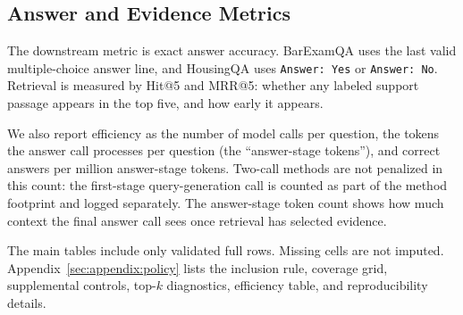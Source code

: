 \subsection{Answer and Evidence Metrics}

The downstream metric is exact answer accuracy. BarExamQA uses the last valid
multiple-choice answer line, and HousingQA uses \texttt{Answer: Yes} or
\texttt{Answer: No}. Retrieval is measured by Hit@5 and MRR@5: whether any
labeled support passage appears in the top five, and how early it appears.

We also report efficiency as the number of model calls per question, the
tokens the answer call processes per question (the ``answer-stage tokens''),
and correct answers per million answer-stage tokens. Two-call methods are
not penalized in this count: the first-stage query-generation call is
counted as part of the method footprint and logged separately. The
answer-stage token count shows how much context the final answer call sees
once retrieval has selected evidence.

The main tables include only validated full rows. Missing cells are not
imputed. Appendix~\ref{sec:appendix:policy} lists the inclusion rule,
coverage grid, supplemental controls, top-$k$ diagnostics, efficiency table,
and reproducibility details.

